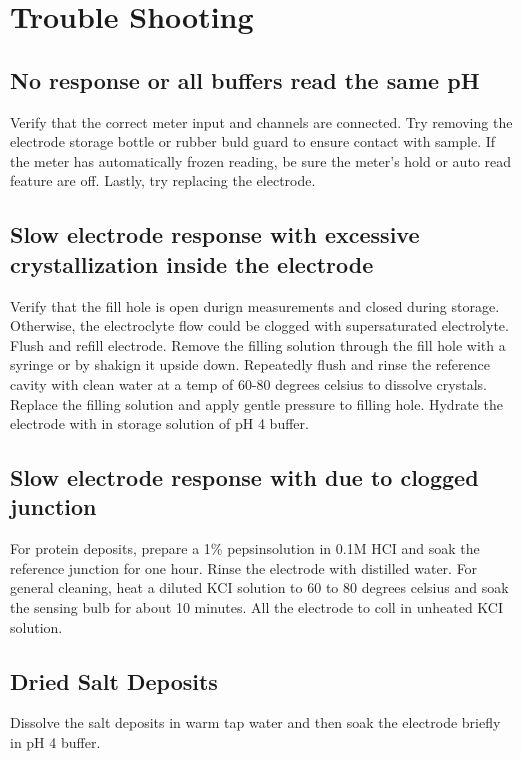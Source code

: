 \documentclass[12pt]{../SOP3_beta}\usepackage[]{graphicx}\usepackage[]{color}
\begin{document}
\section{Trouble Shooting}

\subsection{No response or all buffers read the same pH}

\NP Verify that the correct meter input and channels are connected. Try removing the electrode storage bottle or rubber buld guard to ensure contact with sample. If the meter has automatically frozen reading, be sure the meter's hold or auto read feature are off. Lastly, try replacing the electrode.  

\subsection{Slow electrode response with excessive crystallization inside the electrode}

\NP Verify that the fill hole is open durign measurements and closed during storage. Otherwise, the electroclyte flow could be clogged with supersaturated electrolyte. Flush and refill electrode. Remove the filling solution through the fill hole with a syringe or by shakign it upside down. Repeatedly flush and rinse the reference cavity with clean water at a temp of 60-80 degrees celsius to dissolve crystals. Replace the filling solution and apply gentle pressure to filling hole. Hydrate the electrode with in storage solution of pH 4 buffer.

\subsection{Slow electrode response with due to clogged junction}

\NP For protein deposits, prepare a 1\% pepsinsolution in 0.1M HCI and soak the reference junction for one hour. Rinse the electrode with distilled water. For general cleaning, heat a diluted KCI solution to 60 to 80 degrees celsius and soak the sensing bulb for about 10 minutes. All the electrode to coll in unheated KCI solution.

\subsection{Dried Salt Deposits}

\NP Dissolve the salt deposits in warm tap water and then soak the electrode briefly in pH 4 buffer.
\end{document}
